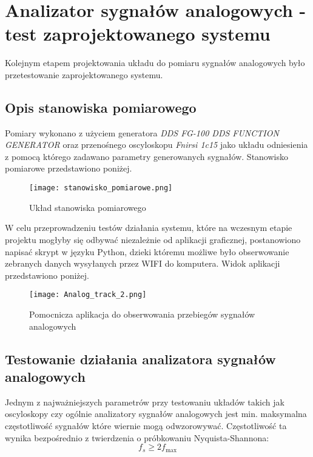 \section{Analizator sygnałów analogowych - test zaprojektowanego systemu}
    Kolejnym etapem projektowania układu do pomiaru sygnałów analogowych było przetestowanie 
    zaprojektowanego systemu.

\subsection{Opis stanowiska pomiarowego}
    Pomiary wykonano z użyciem generatora \textit{DDS FG-100 DDS FUNCTION GENERATOR}
    oraz przenośnego oscyloskopu \textit{Fnirsi 1c15} jako układu odniesienia z pomocą którego
    zadawano parametry generowanych sygnałów. Stanowisko pomiarowe przedstawiono poniżej.

    \begin{figure}[!ht]
        \centering
        \texttt{[image: stanowisko\_pomiarowe.png]}
        \caption{Układ stanowiska pomiarowego}
        \label{fig:stanowisko_pomiarowe}
    \end{figure} 

    W celu przeprowadzeniu testów działania systemu, które na wczesnym etapie projektu
    mogłyby się odbywać niezależnie od aplikacji graficznej, postanowiono napisać
    skrypt w języku Python, dzieki któremu możliwe było obserwowanie zebranych danych
    wysyłanych przez WIFI do komputera. Widok aplikacji przedstawiono poniżej.
    
    \begin{figure}[H]
        \centering
        \texttt{[image: Analog\_track\_2.png]}
        \caption{Pomocnicza aplikacja do obserwowania przebiegów sygnałów analogowych}
        \label{fig:Analog_track_2}
    \end{figure}

\subsection{Testowanie działania analizatora sygnałów analogowych}
    Jednym z najważniejszych parametrów przy testowaniu układów takich jak oscyloskopy
    czy ogólnie analizatory sygnałów analogowych jest min. maksymalna częstotliwość
    sygnałów które wiernie mogą odwzorowywać. Częstotliwość ta wynika bezpośrednio z 
    twierdzenia o próbkowaniu Nyquista-Shannona:
    \[
    f_s \geq 2 f_{\max}
    \]


